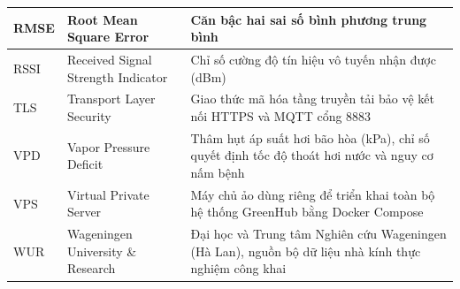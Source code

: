 \begin{small}
\begin{longtable}{|p{2.0cm}|p{5.5cm}|p{6.2cm}|}
RMSE & Root Mean Square Error & Căn bậc hai sai số bình phương trung bình \\ \hline
RSSI & Received Signal Strength Indicator & Chỉ số cường độ tín hiệu vô tuyến nhận được (dBm) \\ \hline
TLS & Transport Layer Security & Giao thức mã hóa tầng truyền tải bảo vệ kết nối HTTPS và MQTT cổng 8883 \\ \hline
VPD & Vapor Pressure Deficit & Thâm hụt áp suất hơi bão hòa (kPa), chỉ số quyết định tốc độ thoát hơi nước và nguy cơ nấm bệnh \\ \hline
VPS & Virtual Private Server & Máy chủ ảo dùng riêng để triển khai toàn bộ hệ thống GreenHub bằng Docker Compose \\ \hline
WUR & Wageningen University \& Research & Đại học và Trung tâm Nghiên cứu Wageningen (Hà Lan), nguồn bộ dữ liệu nhà kính thực nghiệm công khai \\ \hline
\end{longtable}
\end{small}
